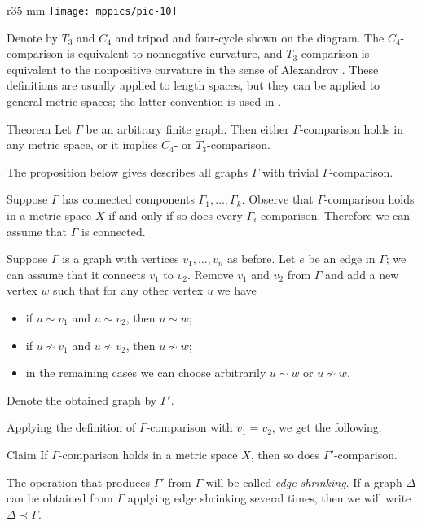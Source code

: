 \documentclass{article}
\begin{document}
\begin{wrapfigure}{r}{35 mm}
\vskip-6mm
\centering
\texttt{[image: mppics/pic-10]}
\end{wrapfigure}

Denote by $T_3$ and $C_4$ and tripod and four-cycle shown on the diagram.
The $C_4$-comparison is equivalent to nonnegative curvature,
and $T_3$-comparison is equivalent to the nonpositive curvature in the sense of Alexandrov \cite{lebedeva-petrunin-zolotov}.
These definitions are usually applied to length spaces, but they can be applied to general metric spaces;
the latter convention is used in \cite{alexander2019alexandrov}.

\begin{thm}{Theorem}
Let $\Gamma$ be an arbitrary finite graph.
Then either $\Gamma$-comparison holds in any metric space,
or it implies $C_4$- or $T_3$-comparison.
\end{thm}

The proposition below gives describes all graphs $\Gamma$ with trivial $\Gamma$-comparison.

Suppose $\Gamma$ has connected components $\Gamma_1,\dots,\Gamma_k$.
Observe that $\Gamma$-comparison holds in a metric space $X$ if and only if so does every $\Gamma_i$-comparison.
Therefore we can assume that $\Gamma$ is connected.

Suppose $\Gamma$ is a graph with vertices $v_1,\dots,v_n$ as before.
Let $e$ be an edge in $\Gamma$; we can assume that it connects $v_1$ to $v_2$.
Remove $v_1$ and $v_2$ from $\Gamma$ and add a new vertex $w$ such that for any other vertex $u$ we have
\begin{itemize}
 \item if $u\sim v_1$ and $u\sim v_2$, then $u\sim w$;
 \item if $u\nsim v_1$ and $u\nsim v_2$, then $u\nsim w$;
 \item in the remaining cases we can choose arbitrarily $u\sim w$ or $u\nsim w$.
\end{itemize}
Denote the obtained graph by $\Gamma'$.

Applying the definition of $\Gamma$-comparison with $v_1=v_2$, we get the following.

\begin{thm}{Claim}
If $\Gamma$-comparison holds in a metric space $X$, then so does $\Gamma'$-comparison.

\end{thm}

The operation that produces $\Gamma'$ from $\Gamma$ will be called \emph{edge shrinking}.
If a graph $\Delta$ can be obtained from $\Gamma$ applying edge shrinking several times, then we will write $\Delta\prec \Gamma$.
\end{document}
